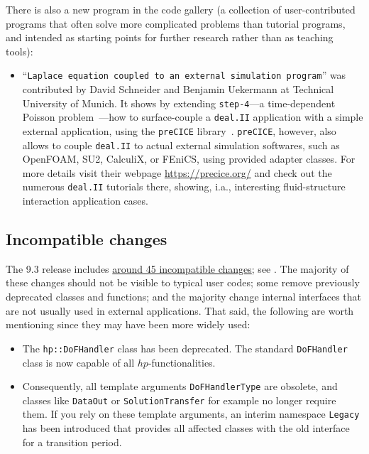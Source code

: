 \documentclass{ansarticle-preprint}
\newcommand{\specialword}[1]{\texttt{#1}}
\newcommand{\dealii}{{\specialword{deal.II}}\xspace}
\begin{document}
There is also a new program in the code gallery (a collection of
user-contributed programs that often solve more complicated problems
than tutorial programs, and intended as starting points for further
research rather than as teaching tools):
\begin{itemize}
\item ``\texttt{Laplace equation coupled to an external simulation program}'' was
  contributed by David Schneider and Benjamin Uekermann at Technical University
  of Munich. It shows by extending \texttt{step-4}---a time-dependent Poisson
  problem~---how to surface-couple a \dealii application with a simple external 
  application, using the \texttt{preCICE} 
  library~\cite{bungartz2016precice, lindner2020exafsa}. \texttt{preCICE},
  however, also allows to couple \dealii to actual external simulation softwares, 
  such as OpenFOAM, SU2, CalculiX, or FEniCS, using provided adapter classes. 
  For more details visit their webpage
  \url{https://precice.org/} and check out the numerous \dealii tutorials there,
  showing, i.a., interesting fluid-structure interaction application cases.
\end{itemize}



\subsection{Incompatible changes}\label{subsec:deprecated}

The 9.3 release includes
\href{https://dealii.org/developer/doxygen/deal.II/changes_between_9_2_0_and_9_3_0.html}
{around 45 incompatible changes}; see \cite{changes93}. The majority of these changes
should not be visible to typical user codes; some remove previously
deprecated classes and functions; and the majority change internal
interfaces that are not usually used in external
applications. That said, the following are worth mentioning since they
may have been more widely used:
\begin{itemize}
  \item The \texttt{hp::DoFHandler} class has been deprecated. The standard
        \texttt{DoFHandler} class is now capable of all $hp$-functionalities.
  \item Consequently, all template arguments \texttt{DoFHandlerType} are obsolete,
        and classes like \texttt{DataOut} or \texttt{SolutionTransfer} for example
        no longer require them. If you rely on these template arguments, an interim
        namespace \texttt{Legacy} has been introduced that provides all affected
        classes with the old interface for a transition period.
\end{itemize}
\end{document}
